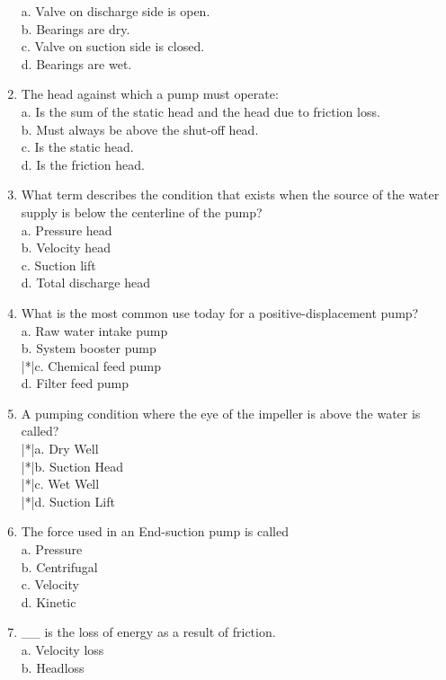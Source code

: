 \begin{enumerate}[1.]
a. Valve on discharge side is open.\\
b. Bearings are dry.\\
c. Valve on suction side is closed.\\
d. Bearings are wet.\\
\item The head against which a pump must operate:\\
a. Is the sum of the static head and the head due to friction loss.\\
b. Must always be above the shut-off head.\\
c. Is the static head.\\
d. Is the friction head.\\
\item What term describes the condition that exists when the source of the water supply is below the centerline of the pump?\\
a. Pressure head\\
b. Velocity head\\
c. Suction lift\\
d. Total discharge head\\
\item What is the most common use today for a positive-displacement pump?\\
a. Raw water intake pump\\
b. System booster pump\\
|*|c. Chemical feed pump\\
d. Filter feed pump\\
\item A pumping condition where the eye of the impeller is above the water is called?\\
|*|a. Dry Well\\
|*|b. Suction Head\\
|*|c. Wet Well\\
|*|d. Suction Lift\\
\item The force used in an End-suction pump is called\\
a. Pressure\\
b. Centrifugal\\
c. Velocity\\
d. Kinetic\\
\item \_\_ is the loss of energy as a result of friction.\\
a. Velocity loss\\
b. Headloss\\

\end{enumerate}
